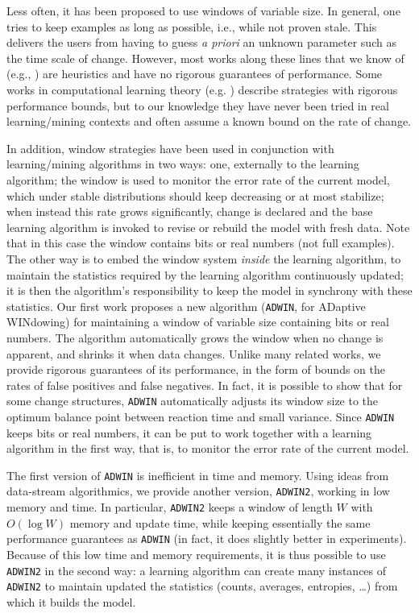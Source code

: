 Less often, it has been proposed to use windows of variable size.
In general, one tries to keep examples as long as possible, i.e., 
while not proven stale. This delivers
the users from having to guess {\em a priori} an unknown parameter such
as the time scale of change. However, most works along these lines 
that we know of (e.g., \cite{Gama,Klinkenberg,Last,WidmerKubat})
are heuristics and have no rigorous guarantees of performance. 
Some works in computational learning theory 
(e.g. \cite{bartlett00,helmbold94tracking,herbster95tracking}) 
describe strategies with rigorous performance
bounds, but to our knowledge they have never been tried
in real learning/mining contexts and often assume a known bound 
on the rate of change. 

In addition, window strategies have been used in conjunction
with learning/mining algorithms in two ways: one,
externally to the learning algorithm; the window is used
to monitor the error rate of the current model, which under
stable distributions should keep decreasing or at most stabilize;
when instead this rate grows significantly, change is declared and
the base learning algorithm is invoked to revise or rebuild the
model with fresh data. Note that in this case the window
contains bits or real numbers (not full examples).
The other way is to embed the window system {\em inside} the learning
algorithm, to maintain the statistics required by the learning
algorithm continuously updated; it is then the algorithm's responsibility
to keep the model in synchrony with these statistics. 
\ENDOMIT
Our first work \cite{bif-gav}
proposes a new algorithm ({\tt ADWIN}, for ADaptive
WINdowing) %
for maintaining a window of variable size containing bits or real numbers.
The algorithm automatically grows the window when no change is apparent,
and shrinks it when data changes.
Unlike many related works, we provide rigorous guarantees of
its performance, in the form of bounds on the rates of false positives
and false negatives.
In fact, it is possible to show that for some change structures, {\tt ADWIN}
automatically adjusts its window size to the optimum balance point
between reaction time and small variance.
Since {\tt ADWIN} keeps bits or real numbers, it can be put to work
together with a learning algorithm in the first way, that is,
to monitor the error rate of the current model.

The first version of {\tt ADWIN} is inefficient in time and memory.
Using ideas from data-stream algorithmics,
we provide another version, {\tt ADWIN2}, working in low memory and
time. In particular, {\tt ADWIN2} keeps a window of length $W$ with
$O(\log W)$ memory and update time, while keeping essentially
the same performance guarantees as {\tt ADWIN} (in fact, it does
slightly better in experiments).
Because of this low time and memory requirements, it is thus possible
to use {\tt ADWIN2} in the second way: a learning algorithm
can create many instances of {\tt ADWIN2} to maintain updated
the statistics (counts, averages, entropies, \dots) from which it
builds the model. 


